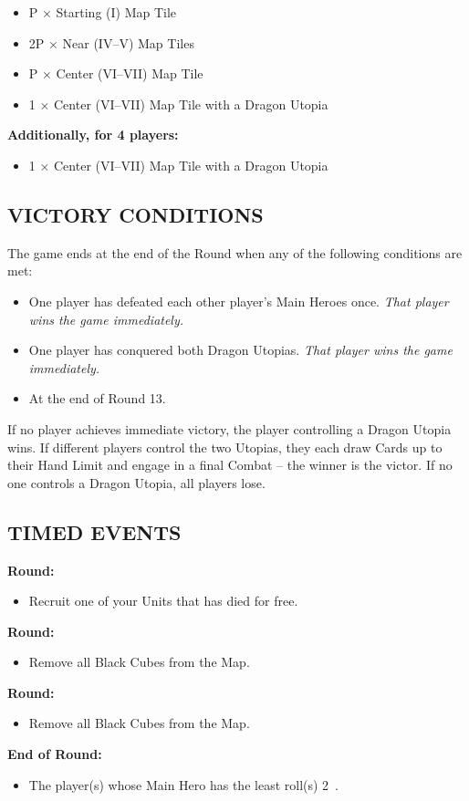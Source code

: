 \begin{multicols*}{2}
\begin{itemize}
  \item P × Starting (I) Map Tile

  \item 2P × Near (IV–V) Map Tiles
  \item P × Center (VI–VII) Map Tile
  \item 1 × Center (VI–VII) Map Tile with a Dragon Utopia
\end{itemize}

\textbf{Additionally, for 4 players:}
\begin{itemize}
  \item 1 × Center (VI–VII) Map Tile with a Dragon Utopia
\end{itemize}

\subsection*{\MakeUppercase{Victory Conditions}}
The game ends at the end of the Round when any of the following conditions are met:

\begin{itemize}
 \item One player has defeated each other player's Main Heroes once. \textit{That player wins the game immediately.}
 \item One player has conquered both Dragon Utopias. \textit{That player wins the game immediately.}
 \item At the end of Round 13.
\end{itemize}

If no player achieves immediate victory, the player controlling a Dragon Utopia wins.
If different players control the two Utopias, they each draw Cards up to their Hand Limit and engage in a final Combat -- the winner is the victor.
If no one controls a Dragon Utopia, all players lose.
\subsection*{\MakeUppercase{Timed Events}}

\textbf{ Round:}
\begin{itemize}
  \item Recruit one of your Units that has died for free.
\end{itemize}
\textbf{ Round:}
\begin{itemize}
  \item Remove all Black Cubes from the Map.
\end{itemize}
\textbf{ Round:}
\begin{itemize}
  \item Remove all Black Cubes from the Map.
\end{itemize}
\textbf{End of  Round:}
\begin{itemize}
  \item The player(s) whose Main Hero has the least  roll(s) 2~.
\end{itemize}


\end{multicols*}
